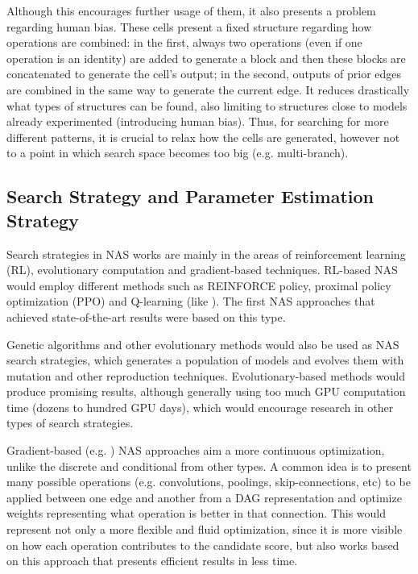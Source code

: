 \documentclass[conference]{IEEEtran}
\begin{document}
	Although this encourages further usage of them, it also presents a problem regarding human bias.
	These cells present a fixed structure regarding how operations are combined: in the first, always two operations (even if one operation is an identity) are added to generate a block and then these blocks are concatenated to generate the cell's output; in the second, outputs of prior edges are combined in the same way to generate the current edge.
	It reduces drastically what types of structures can be found, also limiting to structures close to models already experimented (introducing human bias).
	Thus, for searching for more different patterns, it is crucial to relax how the cells are generated, however not to a point in which search space becomes too big (e.g. multi-branch).
	
	\subsection{Search Strategy and Parameter Estimation Strategy}
	
	Search strategies in NAS works are mainly in the areas of reinforcement learning (RL), evolutionary computation \cite{ baker2016designing, liu2017hierarchical, real2017large, miikkulainen2017evolving, suganuma2017genetic, zhong2018practical, elsken1804efficient} and gradient-based techniques.
	RL-based NAS would employ different methods such as REINFORCE policy, proximal policy optimization (PPO) and Q-learning (like \cite{zoph2016neural, zoph2017learning, baker2016designing}). The first NAS approaches that achieved state-of-the-art results were based on this type. 
	
	Genetic algorithms and other evolutionary methods would also be used as NAS search strategies, which generates a population of models and evolves them with mutation and other reproduction techniques.
	Evolutionary-based methods would produce promising results, although generally using too much GPU computation time (dozens to hundred GPU days), which would encourage research in other types of search strategies.
	
	Gradient-based (e.g. \cite{saxena2016convolutional, liu2018darts, pham2018efficient, chen2019progressive, weng2019automatic, xu2019pc}) NAS approaches aim a more continuous optimization, unlike the discrete and conditional from other types.
	A common idea is to present many possible operations (e.g. convolutions, poolings, skip-connections, etc) to be applied between one edge and another from a DAG representation and optimize weights representing what operation is better in that connection.
	This would represent not only a more flexible and fluid optimization, since it is more visible on how each operation contributes to the candidate score, but also works based on this approach that presents efficient results in less time.
	
\end{document}
